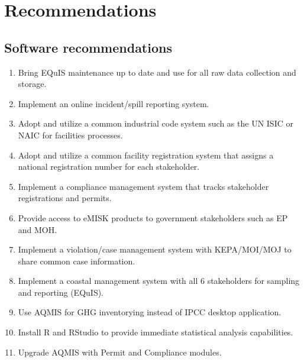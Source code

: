 \chapter{Recommendations}

\section{Software recommendations}
\begin{enumerate}
\item Bring EQuIS maintenance up to date and use for all raw data collection and storage.
\item Implement an online incident/spill reporting system.
\item Adopt and utilize a common industrial code system such as the UN ISIC or NAIC for facilities processes.
\item Adopt and utilize a common facility registration system that assigns a national registration number for each stakeholder. 
\item Implement a compliance management system that tracks stakeholder registrations and permits.
\item Provide access to eMISK products to government stakeholders such as EP and MOH.
\item Implement a violation/case management system with KEPA/MOI/MOJ to share common case information.
\item Implement a coastal management system with all 6 stakeholders for sampling and reporting (EQuIS).
\item Use AQMIS for GHG inventorying instead of IPCC desktop application.
\item Install R and RStudio to provide immediate statistical analysis capabilities.
\item Upgrade AQMIS with Permit and Compliance modules.
\end{enumerate}

